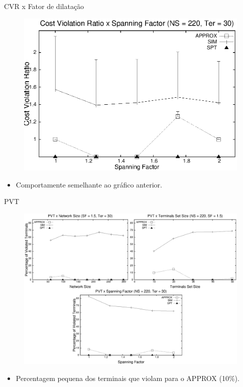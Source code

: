 \documentclass[10pt]{beamer}
\begin{document}
\begin{frame}{CVR x Fator de dilatação}
\begin{figure}[H]
\centering
\includegraphics[scale=0.60]{imagens/defesa-cvr_sf}
\label{fig:cvr_sf}
\end{figure}
\begin{itemize}
  \item Comportamente semelhante ao gráfico anterior.
\end{itemize}
\end{frame}

\begin{frame}{PVT}
\begin{figure}[H]
\centering
\includegraphics[scale=0.30]{imagens/violatedNodesRatio-220-3_graficos_nao_alinhados}
\label{fig:pvt_3}
\end{figure}
\begin{itemize}
  \item Percentagem pequena dos terminais que violam para o APPROX (10\%).
\end{itemize}
\end{frame}
\end{document}
